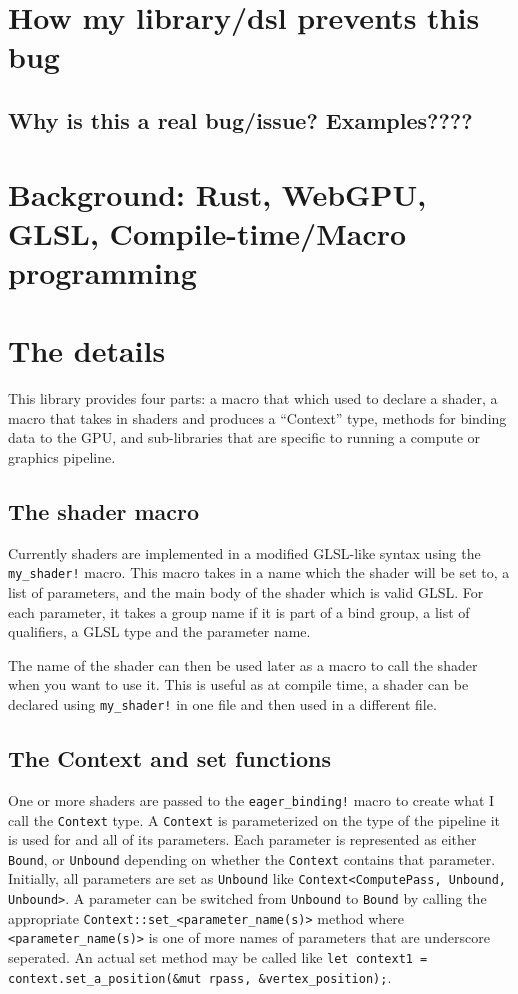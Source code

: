 \documentclass{article}
\begin{document}
\section{How my library/dsl prevents this bug}
\subsection{Why is this a real bug/issue? Examples????}
\section{Background: Rust, WebGPU, GLSL, Compile-time/Macro programming}
\section{The details}
This library provides four parts: a macro that which used to declare a shader, a macro that takes in shaders and produces a ``Context'' type, methods for binding data to the GPU, and sub-libraries that are specific to running a compute or graphics pipeline.

\subsection{The shader macro}
Currently shaders are implemented in a modified GLSL-like syntax using the \lstinline{my_shader!} macro. This macro takes in a name which the shader will be set to, a list of parameters, and the main body of the shader which is valid GLSL. For each parameter, it takes a group name if it is part of a bind group, a list of qualifiers, a GLSL type and the parameter name.

The name of the shader can then be used later as a macro to call the shader when you want to use it. This is useful as at compile time, a shader can be declared using \lstinline{my_shader!} in one file and then used in a different file.
\subsection{The Context and set functions}

One or more shaders are passed to the \lstinline{eager_binding!} macro to create what I call the \lstinline{Context} type. A \lstinline{Context} is parameterized on the type of the pipeline it is used for and all of its parameters. Each parameter is represented as either \lstinline{Bound}, or \lstinline{Unbound} depending on whether the \lstinline{Context} contains that parameter. Initially, all parameters are set as \lstinline{Unbound} like \lstinline{Context<ComputePass, Unbound, Unbound>}. A parameter can be switched from \lstinline{Unbound} to \lstinline{Bound} by calling the appropriate \lstinline{Context::set_<parameter_name(s)>} method where \lstinline{<parameter_name(s)>} is one of more names of parameters that are underscore seperated. An actual set method may be called like \lstinline{let context1 = context.set_a_position(&mut rpass, &vertex_position);}.
\end{document}

